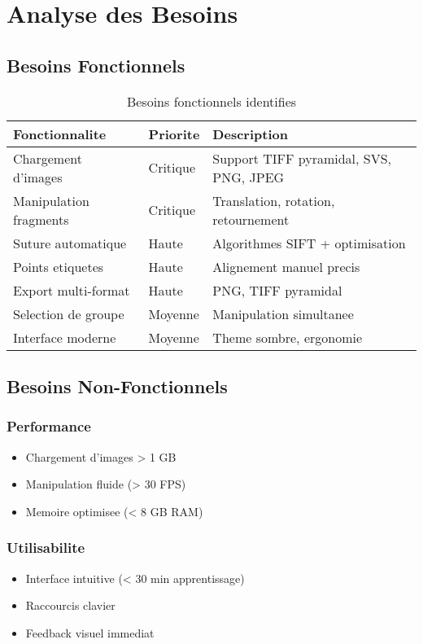 \documentclass[12pt,a4paper]{article}
\begin{document}
\section{Analyse des Besoins}

\subsection{Besoins Fonctionnels}

\begin{table}[h]
\centering
\begin{tabular}{|p{4cm}|p{2cm}|p{6cm}|}
\hline
\textbf{Fonctionnalite} & \textbf{Priorite} & \textbf{Description} \\
\hline
Chargement d'images & Critique & Support TIFF pyramidal, SVS, PNG, JPEG \\
\hline
Manipulation fragments & Critique & Translation, rotation, retournement \\
\hline
Suture automatique & Haute & Algorithmes SIFT + optimisation \\
\hline
Points etiquetes & Haute & Alignement manuel precis \\
\hline
Export multi-format & Haute & PNG, TIFF pyramidal \\
\hline
Selection de groupe & Moyenne & Manipulation simultanee \\
\hline
Interface moderne & Moyenne & Theme sombre, ergonomie \\
\hline
\end{tabular}
\caption{Besoins fonctionnels identifies}
\end{table}

\subsection{Besoins Non-Fonctionnels}

\subsubsection{Performance}
\begin{itemize}
\item Chargement d'images > 1 GB
\item Manipulation fluide (> 30 FPS)
\item Memoire optimisee (< 8 GB RAM)
\end{itemize}

\subsubsection{Utilisabilite}
\begin{itemize}
\item Interface intuitive (< 30 min apprentissage)
\item Raccourcis clavier
\item Feedback visuel immediat
\end{itemize}
\end{document}
